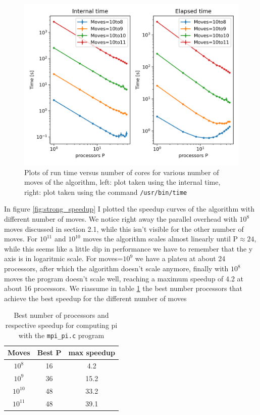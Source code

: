 \documentclass[a4paper]{article}
\begin{document}
\begin{figure}[h]
    \centering
    \includegraphics[scale=0.9]{strong_scaling_times.png}
    \caption{Plots of run time versus number of cores for various number of moves of the algorithm, left: plot taken using the internal time, right: plot taken using the command \texttt{/usr/bin/time}}
    \label{fig:strong_times}
\end{figure}

In figure \ref{fig:strong_speedup} I plotted the speedup curves of the algorithm with different number of moves. We notice right away the parallel overhead with $10^8$ moves discussed in section 2.1, while this isn't visible for the other number of moves. For $10^{11}$ and $10^{10}$ moves the algorithm scales almost linearly until P$\approx 24$, while this seems like a little dip in performance we have to remember that the y axis is in logaritmic scale. For moves=$10^9$ we have a plateu at about 24 processors, after which the algorithm doesn't scale anymore, finally with $10^8$ moves the program doesn't scale well, reaching a maximum speedup of 4.2 at about 16 processors. We riassume in table \ref{tab:speedup_strong} the best number processors that achieve the best speedup for the different number of moves

\begin{table}[h]
    \centering
    \begin{tabular}{ccc}
        Moves & Best P & max speedup\\
        \hline\hline
        $10^{8}$ & 16 &4.2\\
        $10^{9}$ & 36 &15.2\\
        $10^{10}$ & 48 &33.2\\
        $10^{11}$ & 48 &39.1\\
        \hline
    \end{tabular}
    \caption{Best number of processors and respective speedup for computing pi with the \texttt{mpi\_pi.c} program}
    \label{tab:speedup_strong}
\end{table}
\end{document}
